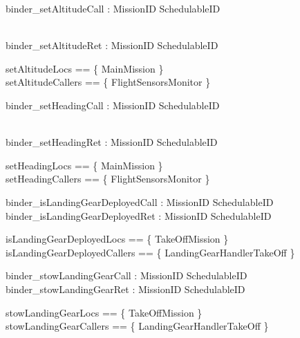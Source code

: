 %
\begin{circus}

\circchannel binder\_setAltitudeCall :  MissionID  \cross SchedulableID   \cross
{}

\\
\circchannel binder\_setAltitudeRet : MissionID  \cross SchedulableID  \\
\end{circus}
%
\begin{zed}
setAltitudeLocs == \{ MainMission \}  \\
setAltitudeCallers == \{ FlightSensorsMonitor \}
\end{zed}
%
\begin{circus}

\circchannel binder\_setHeadingCall :  MissionID  \cross SchedulableID   \cross
{}

\\
\circchannel binder\_setHeadingRet : MissionID  \cross SchedulableID  \\
\end{circus}
%
\begin{zed}
setHeadingLocs == \{ MainMission \}  \\
setHeadingCallers == \{ FlightSensorsMonitor \}
\end{zed}
%
\begin{circus}

\circchannel binder\_isLandingGearDeployedCall :  MissionID  \cross SchedulableID  \\
\circchannel binder\_isLandingGearDeployedRet : MissionID \cross SchedulableID \cross \boolean \\
\end{circus}
%
\begin{zed}
isLandingGearDeployedLocs == \{ TakeOffMission \}  \\
isLandingGearDeployedCallers == \{ LandingGearHandlerTakeOff \}
\end{zed}
%
\begin{circus}

\circchannel binder\_stowLandingGearCall :  MissionID  \cross SchedulableID  \\
\circchannel binder\_stowLandingGearRet : MissionID  \cross SchedulableID  \\
\end{circus}
%
\begin{zed}
stowLandingGearLocs == \{ TakeOffMission \}  \\
stowLandingGearCallers == \{ LandingGearHandlerTakeOff \}
\end{zed}

